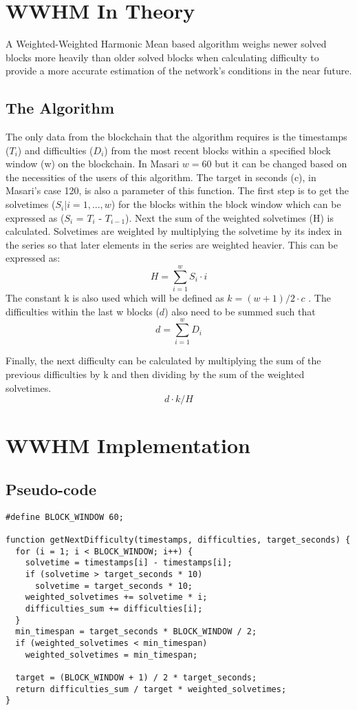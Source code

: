 \documentclass{article}
\begin{document}
\section{WWHM In Theory}
A Weighted-Weighted
Harmonic Mean based algorithm weighs
newer solved blocks more heavily than
older solved blocks when calculating
difficulty to provide a more accurate
estimation of the network's conditions in
the near future.
\subsection{The Algorithm}
The only data
from the blockchain that the algorithm
requires is the timestamps ($T_{i}$) and
difficulties ($D_{i}$) from the most recent
blocks within a specified block window (w)
on the blockchain. In Masari $w = 60$ but it can be changed based on the necessities of the users of this algorithm. The target in seconds (c), in Masari's case 120, is also a parameter of this function. The first step is to get
the solvetimes ($S_{i} | i = 1 ,...,w$) for the blocks
within the block window which can be
expressed as ($S_{i}$ = $T_{i}$ - $T_{i-1}$). Next the sum of the weighted solvetimes (H) is calculated. Solvetimes are weighted by multiplying the solvetime by its index in the series so that later elements in the series are weighted heavier. This can be expressed as: 
$$H = \sum_{i=1}^{w} S_{i}\cdot i$$
The constant k is also used which will be defined as $k = (w+1)/2\cdot c$ .
The difficulties within the last w blocks ($d$) also need to be summed such that $$d = \sum_{i=1}^{w}D_i$$

Finally, the next difficulty can be calculated by multiplying the sum of the previous difficulties by k and then dividing by the sum of the weighted solvetimes.
 $$d\cdot k / H$$
 
\section{WWHM Implementation}
\subsection{Pseudo-code}
\lstset {language=C}
\begin{lstlisting}
#define BLOCK_WINDOW 60;

function getNextDifficulty(timestamps, difficulties, target_seconds) {
  for (i = 1; i < BLOCK_WINDOW; i++) {
    solvetime = timestamps[i] - timestamps[i];
    if (solvetime > target_seconds * 10)
      solvetime = target_seconds * 10;
    weighted_solvetimes += solvetime * i;
    difficulties_sum += difficulties[i];
  }
  min_timespan = target_seconds * BLOCK_WINDOW / 2;
  if (weighted_solvetimes < min_timespan)
    weighted_solvetimes = min_timespan;
  
  target = (BLOCK_WINDOW + 1) / 2 * target_seconds;
  return difficulties_sum / target * weighted_solvetimes;
}

\end{lstlisting}
\end{document}
